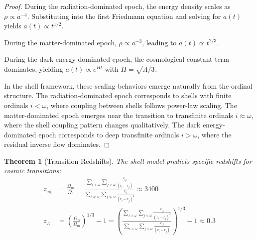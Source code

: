 \documentclass[12pt,a4paper]{article}
\newtheorem{theorem}{Theorem}[section]
\begin{document}
\begin{proof}
During the radiation-dominated epoch, the energy density scales as $\rho \propto a^{-4}$. Substituting into the first Friedmann equation and solving for $a(t)$ yields $a(t) \propto t^{1/2}$.

During the matter-dominated epoch, $\rho \propto a^{-3}$, leading to $a(t) \propto t^{2/3}$.

During the dark energy-dominated epoch, the cosmological constant term dominates, yielding $a(t) \propto e^{Ht}$ with $H = \sqrt{\Lambda/3}$.

In the shell framework, these scaling behaviors emerge naturally from the ordinal structure. The radiation-dominated epoch corresponds to shells with finite ordinals $i < \omega$, where coupling between shells follows power-law scaling. The matter-dominated epoch emerges near the transition to transfinite ordinals $i \approx \omega$, where the shell coupling pattern changes qualitatively. The dark energy-dominated epoch corresponds to deep transfinite ordinals $i > \omega$, where the residual inverse flow dominates.
\end{proof}

\begin{theorem}[Transition Redshifts]
\label{thm:transition-redshifts}
The shell model predicts specific redshifts for cosmic transitions:
\begin{align}
z_{\text{eq}} &= \frac{\Omega_m}{\Omega_r} = \frac{\sum_{i<\omega} \sum_{j>\omega} \frac{c_{ij}}{(r_i - r_j)}}{\sum_{i\ll\omega} \sum_{j\gg\omega} \frac{c_{ij}}{(r_i - r_j)^2}} \approx 3400 \\
z_{\Lambda} &= \left(\frac{\Omega_\Lambda}{\Omega_m}\right)^{1/3} - 1 = \left(\frac{\sum_{i>\omega} \sum_{j<\omega} \frac{c_{ij}}{(r_i - r_j)^3}}{\sum_{i<\omega} \sum_{j>\omega} \frac{c_{ij}}{(r_i - r_j)}}\right)^{1/3} - 1 \approx 0.3
\end{align}
\end{theorem}
\end{document}
